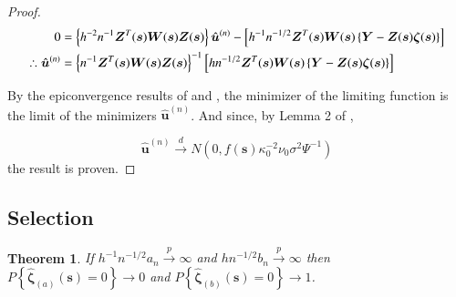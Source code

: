 \documentclass[authoryear, review, 11pt]{elsarticle}
\newtheorem{theorem}{Theorem}[section]
\begin{document}
\begin{proof}
            \begin{align} \label{eq:limit}
                0 &=  \left\{ h^{-2} n^{-1} \bm{Z}^T(\bm{s}) \bm{W}(\bm{s}) \bm{Z}(\bm{s}) \right\} \hat{\bm{u}}^{(n)} - \left[ h^{-1} n^{-1/2} \bm{Z}^T(\bm{s}) \bm{W}(\bm{s}) \left\{ \bm{Y} - \bm{Z}(\bm{s}) \bm{\zeta}(\bm{s}) \right\} \right] \notag \\
                \therefore \hat{\bm{u}}^{(n)} &= \left\{ n^{-1} \bm{Z}^T(\bm{s}) \bm{W}(\bm{s}) \bm{Z}(\bm{s}) \right\}^{-1} \left[ h n^{-1/2} \bm{Z}^T(\bm{s}) \bm{W}(\bm{s}) \left\{ \bm{Y} - \bm{Z}(\bm{s}) \bm{\zeta}(\bm{s}) \right\} \right] \notag \\
            \end{align}

            By the epiconvergence results of \cite{Geyer-1994} and \cite{Knight-Fu-2000}, the minimizer of the limiting function is the limit of the minimizers $\hat{\bm{u}}^{(n)}$. And since, by Lemma 2 of \cite{Sun-Yan-Zhang-Lu-2014}, 

            \begin{equation}
                \hat{\bm{u}}^{(n)} \xrightarrow{d} N \left(0, f(\bm{s}) \kappa_0^{-2} \nu_0 \sigma^2 \Psi^{-1} \right)
            \end{equation}
            the result is proven.
        \end{proof}


    \subsection{Selection}
    
        \begin{theorem} \label{theorem:selection}  
            If $h^{-1} n^{-1/2} a_n \xrightarrow{p} \infty$ and $h n^{-1/2} b_n \xrightarrow{p} \infty$ then $P \left\{ \hat{\bm{\zeta}}_{(a)} (\bm{s}) = 0 \right\} \to 0$ and $P \left\{ \hat{\bm{\zeta}}_{(b)} (\bm{s}) = 0 \right\} \to 1$.
        \end{theorem}
\end{document}
